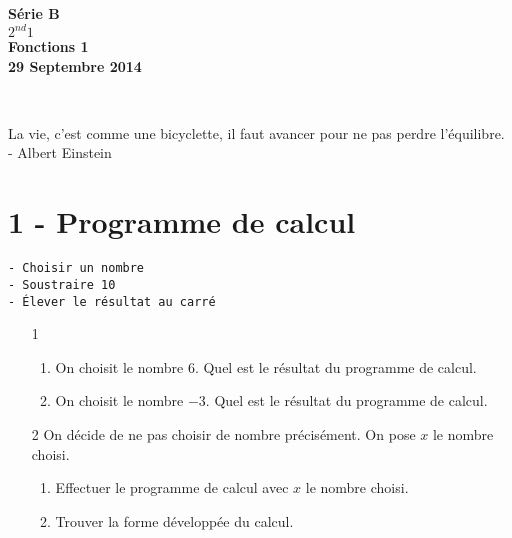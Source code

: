 \documentclass[11pt]{article}
\begin{document}

\begin{minipage}[t]{\textwidth}
  \raggedright
      {\bfseries Série B}\\[.35ex]
      {\bfseries $2^{nd}1$}\\[.35ex]
      \vspace*{-1cm}
      \raggedleft
          {\bfseries Fonctions 1}\\[.35ex]
          {\bfseries 29 Septembre 2014}\\[.35ex]
\end{minipage}\\[1em]

\begin{center}
  \textsf{La vie, c'est comme une bicyclette, il faut avancer pour ne pas perdre l'équilibre. - Albert Einstein}\\
\end{center}

\setlength{\columnseprule}{1pt}

\section*{1 - Programme de calcul}

\begin{verbatim}
- Choisir un nombre
- Soustraire 10
- Élever le résultat au carré
\end{verbatim}

\begin{enumerate}
\item[1]
  \begin{enumerate}
  \item On choisit le nombre $ 6$. Quel est le résultat du programme de calcul.
  \item On choisit le nombre $-3$. Quel est le résultat du programme de calcul.
  \end{enumerate}
\item[2] On décide de ne pas choisir de nombre précisément. On pose $x$ le nombre choisi.
  \begin{enumerate}
  \item Effectuer le programme de calcul avec $x$ le nombre choisi.
  \item Trouver la forme développée du calcul.
  \end{enumerate}
\end{enumerate}
\end{document}
